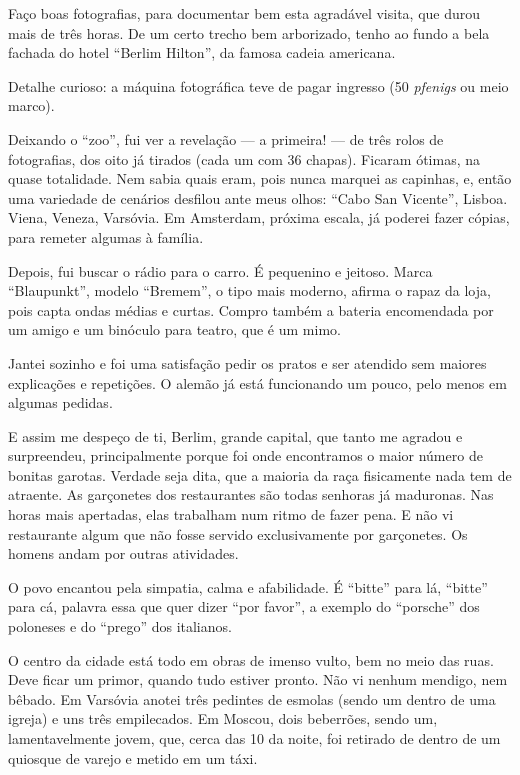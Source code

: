 Faço boas fotografias, para documentar bem esta agradável visita, que durou mais de três horas. De um certo trecho bem arborizado, tenho ao fundo a bela fachada do hotel ``Berlim Hilton'', da famosa cadeia americana.

Detalhe curioso: a máquina fotográfica teve de pagar ingresso (50 \textit{pfenigs} ou meio marco).

Deixando o ``zoo'', fui ver a revelação --- a primeira! --- de três rolos de fotografias, dos oito já tirados (cada um com 36 chapas). Ficaram ótimas, na quase totalidade. Nem sabia quais eram, pois nunca marquei as capinhas, e, então uma variedade de cenários desfilou ante meus olhos: ``Cabo San Vicente'', Lisboa. Viena, Veneza, Varsóvia. Em Amsterdam, próxima escala, já poderei fazer cópias, para remeter algumas à família.

Depois, fui buscar o rádio para o carro. É pequenino e jeitoso. Marca ``Blaupunkt'', modelo ``Bremem'', o tipo mais moderno, afirma o rapaz da loja, pois capta ondas médias e curtas. Compro também a bateria encomendada por um amigo e um binóculo para teatro, que é um mimo.

Jantei sozinho e foi uma satisfação pedir os pratos e ser atendido sem maiores explicações e repetições. O alemão já está funcionando um pouco, pelo menos em algumas pedidas.

E assim me despeço de ti, Berlim, grande capital, que tanto me agradou e surpreendeu, principalmente porque foi onde encontramos o maior número de bonitas garotas. Verdade seja dita, que a maioria da raça fisicamente nada tem de atraente. As garçonetes dos restaurantes são todas senhoras já maduronas. Nas horas mais apertadas, elas trabalham num ritmo de fazer pena. E não vi restaurante algum que não fosse servido exclusivamente por garçonetes. Os homens andam por outras atividades.

O povo encantou pela simpatia, calma e afabilidade. É ``bitte'' para lá, ``bitte'' para cá, palavra essa que quer dizer ``por favor'', a exemplo do ``porsche'' dos poloneses e do ``prego'' dos italianos.

O centro da cidade está todo em obras de imenso vulto, bem no meio das ruas. Deve ficar um primor, quando tudo estiver pronto. Não vi nenhum mendigo, nem bêbado. Em Varsóvia anotei três pedintes de esmolas (sendo um dentro de uma igreja) e uns três empilecados. Em Moscou, dois beberrões, sendo um, lamentavelmente jovem, que, cerca das 10 da noite, foi retirado de dentro de um quiosque de varejo e metido em um táxi.


